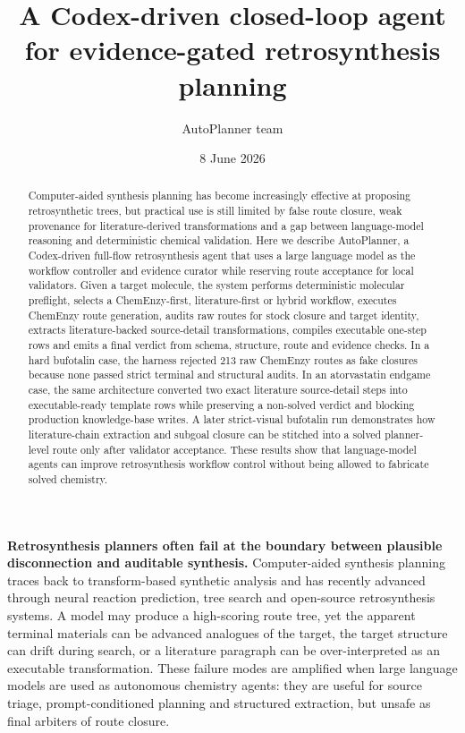 \documentclass[11pt]{article}
\title{\bfseries A Codex-driven closed-loop agent for evidence-gated retrosynthesis planning}
\author[1]{AutoPlanner team}
\affil[1]{AutoPlanner project, local research manuscript draft}
\date{8 June 2026}
\begin{document}
\maketitle

\begin{abstract}
Computer-aided synthesis planning has become increasingly effective at proposing retrosynthetic trees, but practical use is still limited by false route closure, weak provenance for literature-derived transformations and a gap between language-model reasoning and deterministic chemical validation. Here we describe AutoPlanner, a Codex-driven full-flow retrosynthesis agent that uses a large language model as the workflow controller and evidence curator while reserving route acceptance for local validators. Given a target molecule, the system performs deterministic molecular preflight, selects a ChemEnzy-first, literature-first or hybrid workflow, executes ChemEnzy route generation, audits raw routes for stock closure and target identity, extracts literature-backed source-detail transformations, compiles executable one-step rows and emits a final verdict from schema, structure, route and evidence checks. In a hard bufotalin case, the harness rejected 213 raw ChemEnzy routes as fake closures because none passed strict terminal and structural audits. In an atorvastatin endgame case, the same architecture converted two exact literature source-detail steps into executable-ready template rows while preserving a non-solved verdict and blocking production knowledge-base writes. A later strict-visual bufotalin run demonstrates how literature-chain extraction and subgoal closure can be stitched into a solved planner-level route only after validator acceptance. These results show that language-model agents can improve retrosynthesis workflow control without being allowed to fabricate solved chemistry.
\end{abstract}

\textbf{Retrosynthesis planners often fail at the boundary between plausible disconnection and auditable synthesis.} Computer-aided synthesis planning traces back to transform-based synthetic analysis\cite{corey1969retrosynthetic} and has recently advanced through neural reaction prediction, tree search and open-source retrosynthesis systems\cite{segler2018planning,schwaller2020molecular,genheden2020aizynthfinder}. A model may produce a high-scoring route tree, yet the apparent terminal materials can be advanced analogues of the target, the target structure can drift during search, or a literature paragraph can be over-interpreted as an executable transformation. These failure modes are amplified when large language models are used as autonomous chemistry agents\cite{wang2023scientificdiscovery,boiko2023coscientist}: they are useful for source triage, prompt-conditioned planning and structured extraction, but unsafe as final arbiters of route closure.
\end{document}

